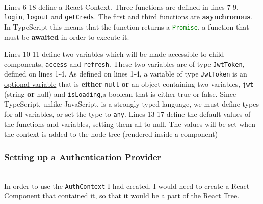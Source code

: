 \documentclass[../../main.tex]{subfiles}
\begin{document}
\noindent \\ Lines 6-18 define a React Context. Three functions are
defined in lines 7-9, \lstinline{login}, \lstinline{logout} and
\lstinline{getCreds}.
The first and third functions are \textbf{asynchronous}.
In TypeScript this means that the function returns a
\lstinline[language=typescript]{Promise}, a function that must be
\textbf{awaited} in order to execute it.

\noindent Lines 10-11 define two variables which will be made accessible to
child components, \lstinline{access} and \lstinline{refresh}.
These two variables are of type \lstinline{JwtToken}, defined on
lines 1-4. As defined on lines 1-4, a variable of type
\lstinline{JwtToken} is an \underline{optional variable} that is
\textbf{either} \lstinline{null} \textbf{or} an object containing
two variables, \lstinline{jwt} (string \textbf{or} null) and
\lstinline{isLoading},a boolean that is either true or false.
Since TypeScript, unlike JavaScript, is a strongly
typed language, we must define types for all variables, or set
the type to \lstinline{any}.
Lines 13-17 define the default values of the functions and variables,
setting them all to null. The values will be set when the context
is added to the node tree (rendered inside a component)

\subsubsection{Setting up a Authentication Provider}

\noindent \\ In order to use the \lstinline{AuthContext} I had
created, I would need to create a React Component that contained it,
so that it would be a part of the React Tree.




\begin{comment}
\paragraph{Configuring Apollo Client to talk to the backend component}


\begin{lstlisting}[language=typescript]
  // Define a hook to be called within SessionProvider to access the session
  export function useSession() {
    const value = React.useContext(AuthContext)

    if (process.env.NODE_ENV !== 'production') {
      if (!value) {
        throw new Error('useSession must be wrapped in a <SessionProvider />');
      }
    }
    return value;
  }
\end{lstlisting}
\end{comment}
\end{document}
